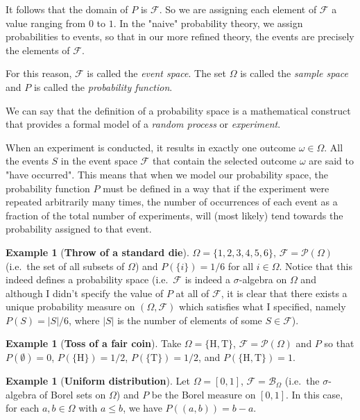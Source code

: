 \documentclass{article}
\theoremstyle{definition}
\newtheorem{example}[theorem]{Example}
\begin{document}
It follows that the domain of $P$ is $\mathcal{F}$. So we are assigning each element of $\mathcal{F}$ a value
ranging from $0$ to $1$. In the "naive" probability theory, we assign probabilities to events, so that in our
more refined theory, the events are precisely the elements of $\mathcal{F}$.

For this reason, $\mathcal{F}$ is called the \textit{event space}. The set $\Omega$ is called the \textit{sample space}
and $P$ is called the \textit{probability function}.

We can say that the definition of a probability space is a mathematical construct that provides a formal model
of a \textit{random process} or \textit{experiment}.

When an experiment is conducted, it results in exactly one outcome $\omega \in \Omega$. All the events $S$ in the event space
$\mathcal{F}$ that contain the selected outcome $\omega$ are said to "have occurred". This means that when we model our
probability space, the probability function $P$ must be defined in a way that if the experiment were repeated arbitrarily
many times, the number of occurrences of each event as a fraction of the total number of experiments, will (most likely)
tend towards the probability assigned to that event.

\begin{example}[\textbf{Throw of a standard die}]
    $\Omega = \{1, 2, 3, 4, 5, 6\}$, $\mathcal{F} = \mathcal{P}(\Omega)$
    (i.e.\ the set of all subsets of $\Omega$) and $P(\{ i \}) = 1/6$ for all $i \in \Omega$. Notice that
    this indeed defines a probability space (i.e.\ $\mathcal{F}$ is indeed a $\sigma$-algebra on $\Omega$ and although
    I didn't specify the value of $P$ at all of $\mathcal{F}$, it is clear that there exists a unique probability measure
    on $(\Omega, \mathcal{F})$ which satisfies what I specified, namely $P(S) = |S|/6$, where $|S|$ is the number of elements
    of some $S \in \mathcal{F}$).
\end{example}

\begin{example}[\textbf{Toss of a fair coin}]
    Take $\Omega = \{ \text{H}, \text{T} \}$, $\mathcal{F} = \mathcal{P}(\Omega)$ and $P$
    so that $P(\emptyset) = 0$, $P(\{ \text{H} \}) = 1/2$, $P(\{ \text{T} \}) = 1/2$, and $P(\{ \text{H}, \text{T} \}) = 1$.
\end{example}

\begin{example}[\textbf{Uniform distribution}]
    Let $\Omega = [0, 1]$, $\mathcal{F} = \mathcal{B}_{\Omega}$ (i.e.\ the $\sigma$-algebra
    of Borel sets on $\Omega$) and $P$ be the Borel measure on $[0, 1]$. In this case, for each $a, b \in \Omega$ with $a \leq b$,
    we have $P((a, b)) = b - a$.
\end{example}
\end{document}
